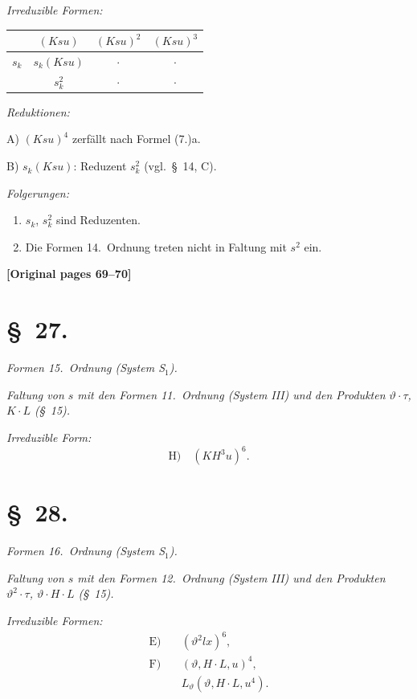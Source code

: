 \documentclass[12pt,a4paper]{article}
\begin{document}
\textit{Irreduzible Formen:}
\begin{center}
\begin{tabular}{c|ccc}
& $(Ksu)$ & $(Ksu)^2$ & $(Ksu)^3$ \\
\hline
$s_k$ & $s_k(Ksu)$ & $\cdot$ & $\cdot$ \\
& $s_k^2$ & $\cdot$ & $\cdot$
\end{tabular}
\end{center}

\textit{Reduktionen:}

A) $(Ksu)^4$ zerfällt nach Formel (7.)a.

B) $s_k(Ksu)$: Reduzent $s_k^2$ (vgl.\ \S\ 14, C).

\textit{Folgerungen:}
\begin{enumerate}
\item[1)] $s_k$, $s_k^2$ sind Reduzenten.
\item[2)] Die Formen 14.\ Ordnung treten nicht in Faltung mit $s^2$ ein.
\end{enumerate}

\noindent\textbf{[Original pages 69--70]}

\section*{\S\ 27.}

\textit{Formen 15.\ Ordnung (System S$_1$).}

\textit{Faltung von $s$ mit den Formen 11.\ Ordnung (System III) und den Produkten $\vartheta \cdot \tau$, $K \cdot L$ (\S\ 15).}

\textit{Irreduzible Form:}
\[\text{H)} \quad (KH^3 u)^6.\]

\section*{\S\ 28.}

\textit{Formen 16.\ Ordnung (System S$_1$).}

\textit{Faltung von $s$ mit den Formen 12.\ Ordnung (System III) und den Produkten $\vartheta^2 \cdot \tau$, $\vartheta \cdot H \cdot L$ (\S\ 15).}

\textit{Irreduzible Formen:}
\begin{align*}
\text{E)} \quad &(\vartheta^2 lx)^6,\\
\text{F)} \quad &(\vartheta, H \cdot L, u)^4,\\
& L_\vartheta(\vartheta, H \cdot L, u^4).
\end{align*}
\end{document}
